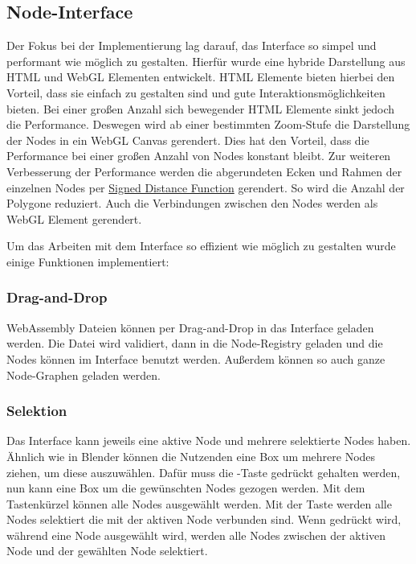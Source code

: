 \documentclass[ngerman]{article}
\begin{document}
\subsection{Node-Interface}
Der Fokus bei der Implementierung lag darauf, das Interface so simpel und performant wie möglich zu gestalten. Hierfür wurde eine hybride Darstellung aus HTML und WebGL Elementen entwickelt. HTML Elemente bieten hierbei den Vorteil, dass sie einfach zu gestalten sind und gute Interaktionsmöglichkeiten bieten. Bei einer großen Anzahl sich bewegender HTML Elemente sinkt jedoch die Performance. 
Deswegen wird ab einer bestimmten Zoom-Stufe die Darstellung der Nodes in ein WebGL Canvas gerendert. Dies hat den Vorteil, dass die Performance bei einer großen Anzahl von Nodes konstant bleibt. 
\br
Zur weiteren Verbesserung der Performance werden die abgerundeten Ecken und Rahmen der einzelnen Nodes per \href{https://en.wikipedia.org/wiki/Signed_distance_function}{Signed Distance Function} gerendert. So wird die Anzahl der Polygone reduziert. Auch die Verbindungen zwischen den Nodes werden als WebGL Element gerendert.

\pagebreak

Um das Arbeiten mit dem Interface so effizient wie möglich zu gestalten wurde einige Funktionen implementiert:

\subsubsection{Drag-and-Drop}
WebAssembly Dateien können per Drag-and-Drop in das Interface geladen werden. Die Datei wird validiert, dann in die Node-Registry geladen und die Nodes können im Interface benutzt werden. Außerdem können so auch ganze Node-Graphen geladen werden.

\subsubsection{Selektion}
Das Interface kann jeweils eine aktive Node und mehrere selektierte Nodes haben.
\br
Ähnlich wie in Blender können die Nutzenden eine Box um mehrere Nodes ziehen, um diese auszuwählen. Dafür muss die -Taste gedrückt gehalten werden, nun kann eine Box um die gewünschten Nodes gezogen werden.
\br
Mit dem Tastenkürzel  können alle Nodes ausgewählt werden. 
\br
Mit der  Taste  werden alle Nodes selektiert die mit der aktiven Node verbunden sind.
\br
Wenn  gedrückt wird, während eine Node ausgewählt wird, werden alle Nodes zwischen der aktiven Node und der gewählten Node selektiert.
\end{document}
